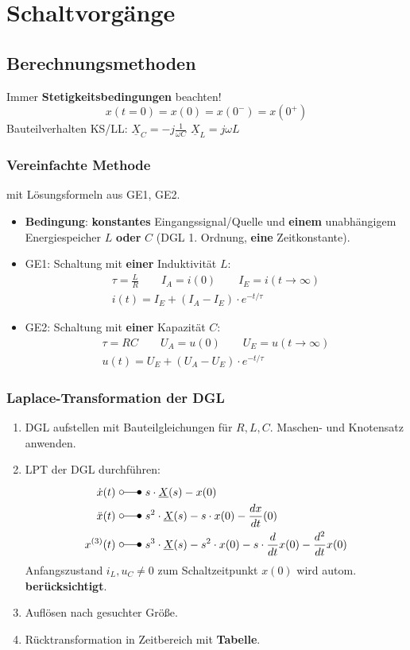 \section{Schaltvorgänge}
\subsection{Berechnungsmethoden}
Immer \textbf{Stetigkeitsbedingungen} beachten!
\[
\boxed{x(t=0) = x(0) = x(0^-) = x(0^+)}
 \]
Bauteilverhalten KS/LL:
 $\underline{X}_C=-j\frac{1}{\omega C}$ \quad $\underline{X}_L =j \omega L$
\subsubsection{Vereinfachte Methode}
mit Lösungsformeln aus GE1, GE2.
\begin{itemize}
	\item \textbf{Bedingung}: \textbf{konstantes} Eingangssignal/Quelle und \textbf{einem} unabhängigem Energiespeicher $L$ \textbf{oder} $C$ (DGL 1. Ordnung, \textbf{eine} Zeitkonstante).
	\item GE1: Schaltung mit \textbf{einer} Induktivität $L$:
	\begin{gather*}
		\tau=\frac{L}{R} \qquad I_A = i(0) \qquad I_E=i(t\rightarrow\infty)\\
		\boxed{i(t)=I_E+(I_A-I_E)\cdot e^{-t/\tau}}
	\end{gather*}
	\item GE2: Schaltung mit \textbf{einer} Kapazität $C$:
	\begin{gather*}
		\tau=RC \qquad U_A = u(0) \qquad U_E=u(t\rightarrow\infty)\\
		\boxed{u(t)=U_E+(U_A-U_E)\cdot e^{-t/\tau}}
	\end{gather*}
	
\end{itemize}

\subsubsection{Laplace-Transformation der DGL}\label{lpt_dgl_ableitung}
\begin{enumerate}
	\item DGL aufstellen mit Bauteilgleichungen f\"ur $R,L,C$. Maschen- und Knotensatz anwenden.
	\item LPT der DGL durchführen:
\begin{align*}
	\dot{x}(t) \ &\laplace\ s\cdot\underline{X}(s)-x(0)\\
	\ddot{x}(t) \ &\laplace\ s^2\cdot\underline{X}(s)-s\cdot x(0)-\frac{dx}{dt}(0)\\
	x^{(3)}(t) \ &\laplace\ s^3\cdot\underline{X}(s)-s^2\cdot x(0)-s\cdot \frac{d}{dt}x(0) - \frac{d^2}{dt}x(0)
\end{align*}
	Anfangszustand $i_L, u_C \neq 0$ zum Schaltzeitpunkt $x(0)$ wird autom. \textbf{berücksichtigt}.
	\item Auflösen nach gesuchter Größe.
	\item Rücktransformation in Zeitbereich mit \textbf{Tabelle}.
\end{enumerate}

